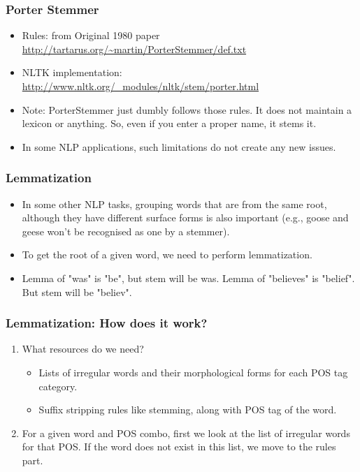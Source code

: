 \documentclass{beamer}
\begin{document}
\begin{frame}
\frametitle{Porter Stemmer}
\begin{itemize}
\item Rules: from Original 1980 paper \url{http://tartarus.org/~martin/PorterStemmer/def.txt}
\item NLTK implementation: \url{http://www.nltk.org/_modules/nltk/stem/porter.html}
\item Note: PorterStemmer just dumbly follows those rules. It does not maintain a lexicon or anything. So, even if you enter a proper name, it stems it. 
\item In some NLP applications, such limitations do not create any new issues.
\end{itemize}
\end{frame}

\begin{frame}
\frametitle{Lemmatization}
\begin{itemize}
\item In some other NLP tasks, grouping words that are from the same root, although they have different surface forms is also important (e.g., goose and geese won't be recognised as one by a stemmer).
\item To get the root of a given word, we need to perform lemmatization. 
\item Lemma of "was" is "be", but stem will be was. Lemma of "believes" is "belief". But stem will be "believ".
\end{itemize}
\end{frame}

\begin{frame}
\frametitle{Lemmatization: How does it work?}
\begin{enumerate}
\item What resources do we need?
\begin{itemize}
\item Lists of irregular words and their morphological forms for each POS tag category.
\item Suffix stripping rules like stemming, along with POS tag of the word.
\end{itemize}
\item For a given word and POS combo, first we look at the list of irregular words for that POS. If the word does not exist in this list, we move to the rules part.
\end{enumerate}
\end{frame}
\end{document}
